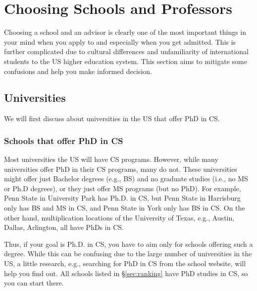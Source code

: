 \documentclass[11pt]{article}
\begin{document}
\section{Choosing Schools and Professors}\label{sec:schoolsandprofs}

Choosing a school and an advisor is clearly one of the most important things in your mind when you apply to and especially when you get admitted.  This is further complicated due to cultural differences and unfamiliarity of  international students to the US higher education system.  This section aims to mitigate some confusions and help you make informed decision. 

\subsection{Universities}

We will first discuss about universities in the US that offer PhD in CS.

\subsubsection{Schools that offer PhD in CS}  

Most universities the US will have CS programs. 
However, while many universities offer PhD in their CS programs, many do not.  These universities might offer just Bachelor degrees (e.g., BS) and no graduate studies (i.e., no MS or Ph.D degrees), or they just offer MS programs (but no PhD). For example, Penn State in University Park has Ph.D. in CS,  but Penn State in Harrisburg only has BS and MS in CS, and Penn State in York only has BS in CS.  On the other hand, multiplication locations of the University of Texas, e.g., Austin, Dallas, Arlington, all have PhDs in CS. 

Thus, if your goal is Ph.D. in CS, you have to aim only for schools offering such a degree.  %
While this can be confusing due to the large number of universities in the US, a little research, e.g., searching for PhD in CS from the school website, will help you find out. All schools listed in \S\ref{sec:ranking} have PhD studies in CS, so you can start there.

\end{document}
